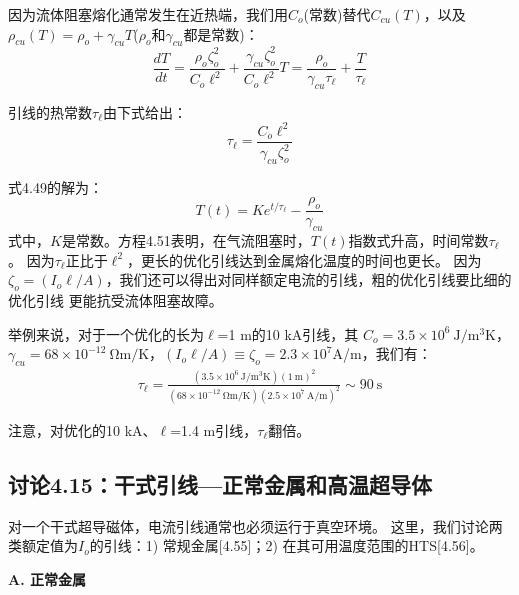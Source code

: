 因为流体阻塞熔化通常发生在近热端，我们用$C_o$(常数)替代$C_{cu}(T)$，以及
$\rho_{cu}(T)=\rho_o+\gamma_{cu}T$($\rho_o$和$\gamma_{cu}$都是常数)：
\begin{equation}%
\frac{dT}{dt}=\frac{\rho_o\zeta_{o}^{2}}{C_o\ell^2}+\frac{\gamma_{cu}\zeta_{o}^{2}}{C_o\ell^2}T=\frac{\rho_o}{\gamma_{cu}\tau_\ell}+\frac{T}{\tau_\ell}
\end{equation}

引线的热常数$\tau_{\ell}$由下式给出：
\begin{equation}%
\tau_\ell=\frac{C_o\ell^2}{\gamma_{cu}\zeta_{o}^{2}}
\end{equation}

式4.49的解为：
\begin{equation}%
T(t)=Ke^{t/\tau_\ell}-\frac{\rho_o}{\gamma_{cu}}
\end{equation}
式中，$K$是常数。方程4.51表明，在气流阻塞时，$T(t)$指数式升高，时间常数$\tau_\ell$。 因为$\tau_\ell$正比于$\ell^2$，更长的优化引线达到金属熔化温度的时间也更长。
因为$\zeta_o=(I_o \ell/A)$，我们还可以得出对同样额定电流的引线，粗的优化引线要比细的优化引线
更能抗受流体阻塞故障。

举例来说，对于一个优化的长为$\ell$=1 m的10 kA引线，其
$C_o=3.5\times 10^6\ \mathrm{J/m^3 K}$，$\gamma_{cu}=68\times 10^{-12}\ \mathrm{\Omega m/K}$，$(I_o \ell/A)\equiv\zeta_o=2.3\times 10^7$A/m，我们有：
\begin{align*}
\tau_\ell=\frac{(3.5\times 10^6\ \mathrm{J/m^3K})(1\ \mathrm{m})^2}{(68\times 10^{-12}\ \mathrm{\Omega m/K})(2.5\times 10^7\ \mathrm{A/m})^2}\sim 90\ \mathrm{s}
\end{align*}

注意，对优化的10 kA、$\ell$=1.4 m引线，$\tau_\ell$翻倍。

\subsection{讨论4.15：干式引线---正常金属和高温超导体}
对一个干式超导磁体，电流引线通常也必须运行于真空环境。
这里，我们讨论两类额定值为$I_o$的引线：1) 常规金属[4.55]；2) 在其可用温度范围的HTS[4.56]。

\textbf{A. 正常金属}

